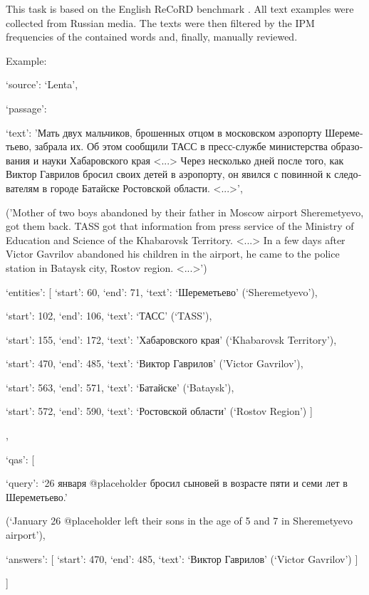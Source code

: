\documentclass[11pt]{article}
\begin{document}
This task is based on the English ReCoRD  benchmark \cite{DBLP:journals/corr/abs-1810-12885}. All text examples were collected from Russian media. The texts were then filtered by the IPM frequencies of the contained words and, finally, manually reviewed. 

\begin{flushleft}
Example:

{`source': `Lenta',

`passage': {

`text':
\foreignlanguage{russian}{'Мать двух мальчиков, брошенных отцом в московском аэропорту Шереметьево,
забрала их. Об этом сообщили ТАСС в пресс-службе министерства образования и науки Хабаровского края <...> Через несколько дней после того, как Виктор Гаврилов бросил своих детей в аэропорту, он явился с повинной к следователям в городе Батайске Ростовской области. <...>'}, 

('Mother of two boys abandoned by their father in Moscow airport Sheremetyevo, got them back. TASS got that information from press service of the Ministry of Education and Science of the Khabarovsk Territory. <...> In a few days after Victor Gavrilov abandoned his children in the airport, he came to the police station in Bataysk city, Rostov region. <...>')
 
`entities': [
{`start': 60, `end': 71, `text': \foreignlanguage{russian}{`Шереметьево'} (`Sheremetyevo')},

{`start': 102, `end': 106, `text': \foreignlanguage{russian}{`ТАСС'} (`TASS')},

{`start': 155, `end': 172, `text': \foreignlanguage{russian}{'Хабаровского края'} (`Khabarovsk Territory')},

{`start': 470, `end': 485, `text': \foreignlanguage{russian}{`Виктор Гаврилов'} ('Victor Gavrilov')},

{`start': 563, `end': 571, `text': \foreignlanguage{russian}{`Батайске'} (`Bataysk')},

{`start': 572, `end': 590, `text': \foreignlanguage{russian}{`Ростовской области'} (`Rostov Region')}
]
},

`qas': [
{

    `query': 
    \foreignlanguage{russian}{`26 января @placeholder бросил сыновей в возрасте пяти и семи лет в Шереметьево.'} 

(`January 26 @placeholder left their sons in the age of 5 and 7 in Sheremetyevo airport'),

`answers': [
    {`start': 470, `end': 485, `text': \foreignlanguage{russian}{`Виктор Гаврилов'} (`Victor Gavrilov')}
              ]
          }
      ]
  }
\end{flushleft}
\end{document}
